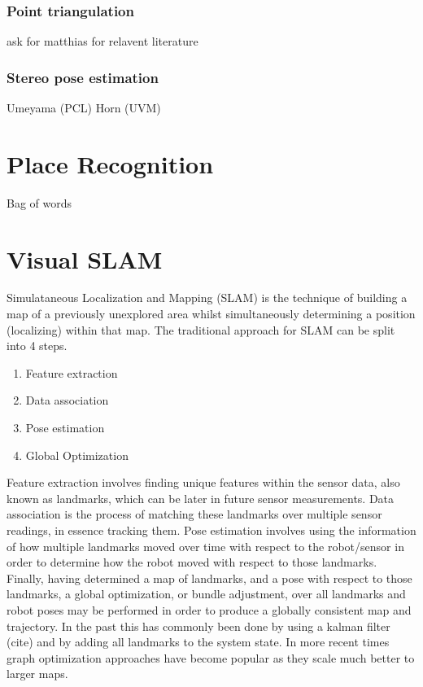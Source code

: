 \subsubsection{Point triangulation}

ask for matthias for relavent literature

\subsubsection{Stereo pose estimation}
\label{subsec:horn}

Umeyama (PCL) \newline 
Horn (UVM)


\section{Place Recognition}

Bag of words

\section{Visual SLAM}


Simulataneous Localization and Mapping (SLAM) is the technique of building a map of a previously
unexplored area whilst simultaneously determining a position (localizing) within that map.  The
traditional approach for SLAM can be split into 4 steps.
\begin{enumerate} \itemsep1pt \parskip0pt 
 \item Feature extraction
 \item Data association
 \item Pose estimation
 \item Global Optimization
\end{enumerate}

Feature extraction involves finding unique features within the sensor data, also known as
landmarks, which can be later in future sensor measurements.  Data association is the process of
matching these landmarks over multiple sensor readings, in essence tracking them.  Pose estimation
involves using the information of how multiple landmarks moved over time with respect to the
robot/sensor in order to determine how the robot moved with respect to those landmarks.  Finally,
having determined a map of landmarks, and a pose with respect to those landmarks, a global
optimization, or bundle adjustment, over all landmarks and robot poses may be performed in order to
produce a globally consistent map and trajectory.  In the past this has commonly been done by using
a kalman filter (cite) and by adding all landmarks to the system state.  In more recent times graph
optimization approaches have become popular as they scale much better to larger maps.

